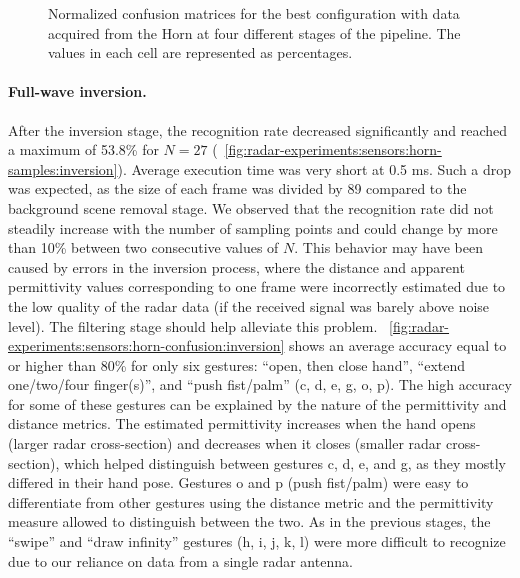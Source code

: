 \begin{figure}[tbp]
    \vspace{-6pt}
    \caption{Normalized confusion matrices for the best configuration with data acquired from the Horn at four different stages of the pipeline. The values in each cell are represented as percentages.}
    \label{fig:radar-experiments:sensors:horn-confusion}
\end{figure}

\paragraph{Full-wave inversion.}
After the inversion stage, the recognition rate decreased significantly and reached a maximum of 53.8\% for $N{=}27$ (\fig~\ref{fig:radar-experiments:sensors:horn-samples:inversion}). Average execution time was very short at 0.5 ms. Such a drop was expected, as the size of each frame was divided by 89 compared to the background scene removal stage. 
%
We observed that the recognition rate did not steadily increase with the number of sampling points and could change by more than 10\% between two consecutive values of $N$. This behavior may have been caused by errors in the inversion process, where the distance and apparent permittivity values corresponding to one frame were incorrectly estimated due to the low quality of the radar data (\eg if the received signal was barely above noise level). The filtering stage should help alleviate this problem.
%
\fig~\ref{fig:radar-experiments:sensors:horn-confusion:inversion} shows an average accuracy equal to or higher than 80\% for only six gestures: ``open, then close hand'',  ``extend one/two/four finger(s)'', and ``push fist/palm'' (c, d, e, g, o, p). 
The high accuracy for some of these gestures can be explained by the nature of the permittivity and distance metrics. 
%
The estimated permittivity increases when the hand opens (larger radar cross-section) and decreases when it closes (smaller radar cross-section), which helped distinguish between gestures c, d, e, and g, as they mostly differed in their hand pose.
%
Gestures o and p (push fist/palm) were easy to differentiate from other gestures using the distance metric and the permittivity measure allowed to distinguish between the two.
%
As in the previous stages, the ``swipe'' and ``draw infinity'' gestures (h, i, j, k, l) were more difficult to recognize due to our reliance on data from a single radar antenna.


